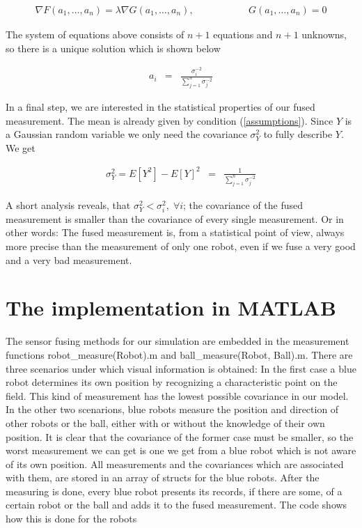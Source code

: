 	\begin{eqnarray}\label{lagrange_multipliers}
    			 \nabla F(a_1,\ldots,a_n) = \lambda \nabla G(a_1,\ldots,a_n), \qquad && \qquad G(a_1,\ldots,a_n) = 0
	\end{eqnarray}

The system of equations above consists of \(n+1\) equations and \(n+1\) unknowns, so there is a unique solution which is shown below

	\begin{eqnarray}\label{solution}
    			 a_i &=& \frac{\sigma_i^{-2}}{\sum_{j=1}^n \sigma_j^{-2}}
	\end{eqnarray}

In a final step, we are interested in the statistical properties of our fused measurement. The mean is already given by condition (\ref{assumptions}). Since \(Y\) is a Gaussian random variable we only need the covariance \(\sigma_Y^2\) to fully describe \(Y\). We get

	\begin{eqnarray}\label{solution}
    			 \sigma_Y^2 = E\left[ Y^2 \right] - E[Y]^2 &=& \frac{1}{\sum_{j=1}^n \sigma_j^{-2}}
	\end{eqnarray}

A short analysis reveals, that \(\sigma_Y^2 < \sigma_i^2, \; \forall i\); the covariance of the fused measurement is smaller than the covariance of every single measurement. Or in other words: The fused measurement is, from a statistical point of view, always more precise than the measurement of only one robot, even if we fuse a very good and a very bad measurement.


\section{The implementation in MATLAB}

The sensor fusing methods for our simulation are embedded in the measurement functions {\selectfont robot\_measure(Robot).m} and {\selectfont ball\_measure(Robot, Ball).m}. There are three scenarios under which visual information is obtained: In the first case a blue robot determines its own position by recognizing a characteristic point on the field. This kind of measurement has the lowest possible covariance in our model. In the other two scenarions, blue robots measure the position and direction of other robots or the ball, either with or without the knowledge of their own position. It is clear that the covariance of the former case must be smaller, so the worst measurement we can get is one we get from a blue robot which is not aware of its own position. All measurements and the covariances which are associated with them, are stored in an array of structs for the blue robots. After the measuring is done, every blue robot presents its records, if there are some, of a certain robot or the ball and adds it to the fused measurement. The code shows how this is done for the robots

